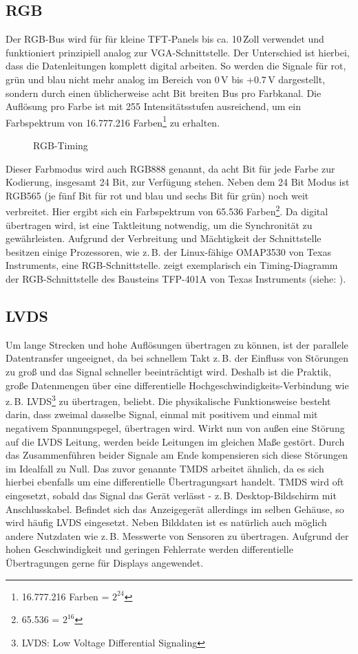 \subsection{RGB}
Der RGB-Bus wird für für kleine TFT-Panels bis ca. 10\,Zoll verwendet und funktioniert prinzipiell analog zur VGA-Schnittstelle. Der Unterschied ist hierbei, dass die Datenleitungen komplett digital arbeiten. So werden die Signale für rot, grün und blau nicht mehr analog im Bereich von 0\,V bis +0.7\,V dargestellt, sondern durch einen üblicherweise acht Bit breiten Bus pro Farbkanal. Die Auflösung pro Farbe ist mit 255 Intensitätsstufen ausreichend, um ein Farbspektrum von 16.777.216 Farben\footnote{16.777.216 Farben = $2^{24}$} zu erhalten. 
\begin{figure}[htp]
	\centering
{}
	\caption{RGB-Timing}
	\label{fig:rgb_timing}
\end{figure}
Dieser Farbmodus wird auch RGB888 genannt, da acht Bit für jede Farbe zur Kodierung, insgesamt 24 Bit, zur Verfügung stehen. Neben dem 24 Bit Modus ist RGB565 (je fünf Bit für rot und blau und sechs Bit für grün) noch weit verbreitet. Hier ergibt sich ein Farbspektrum von 65.536 Farben\footnote{65.536 = $2^{16}$}. Da digital übertragen wird, ist eine Taktleitung notwendig, um die Synchronität zu gewährleisten. 
Aufgrund der Verbreitung und Mächtigkeit der Schnittstelle besitzen einige Prozessoren, wie z.\,B. der Linux-fähige OMAP3530 von Texas Instruments, eine RGB-Schnittstelle. 
 zeigt exemplarisch ein Timing-Diagramm der RGB-Schnittstelle des Bausteins TFP-401A von Texas Instruments (siehe: \cite{TI2011}).
\subsection{LVDS}
Um lange Strecken und hohe Auflösungen übertragen zu können, ist der parallele Datentransfer ungeeignet, da bei schnellem Takt z.\,B. der Einfluss von Störungen zu groß und das Signal schneller beeinträchtigt wird. Deshalb ist die Praktik, große Datenmengen über eine differentielle Hochgeschwindigkeits-Verbindung wie z.\,B. LVDS\footnote{LVDS: Low Voltage Differential Signaling} zu übertragen, beliebt. Die physikalische Funktionsweise besteht darin, dass zweimal dasselbe Signal, einmal mit positivem und einmal mit negativem Spannungspegel, übertragen wird. Wirkt nun von außen eine Störung auf die LVDS Leitung, werden beide Leitungen im gleichen Maße gestört. Durch das Zusammenführen beider Signale am Ende kompensieren sich diese Störungen im Idealfall zu Null. Das zuvor genannte TMDS arbeitet ähnlich, da es sich hierbei ebenfalls um eine differentielle Übertragungsart handelt. TMDS wird oft eingesetzt, sobald das Signal das Gerät verlässt - z.\,B. Desktop-Bildschirm mit Anschlusskabel. Befindet sich das Anzeigegerät allerdings im selben Gehäuse, so wird häufig LVDS eingesetzt. Neben Bilddaten ist es natürlich auch möglich andere Nutzdaten wie z.\,B. Messwerte von Sensoren zu übertragen. 
Aufgrund der hohen Geschwindigkeit und geringen Fehlerrate werden differentielle Übertragungen gerne für Displays angewendet.

